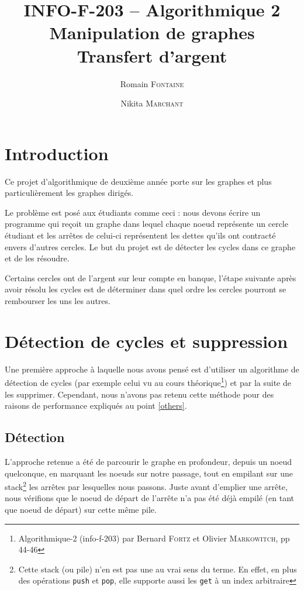 \documentclass[12pt, oneside]{article}
\title{{\normalsize{INFO-F-203 -- Algorithmique 2}}\\Manipulation de graphes\\ Transfert d’argent}
\author{Romain \textsc{Fontaine} \and Nikita \textsc{Marchant}}
\begin{document}
\maketitle

\section{Introduction}

Ce projet d'algorithmique de deuxième année porte sur les graphes et plus particulièrement les graphes dirigés.

Le problème est posé aux étudiants comme ceci : nous devons écrire un programme qui reçoit un graphe dans lequel chaque noeud représente un cercle étudiant et les arrêtes de celui-ci représentent les dettes qu'ils ont contracté envers d'autres cercles. Le but du projet est de détecter les cycles dans ce graphe et de les résoudre.

Certains cercles ont de l'argent sur leur compte en banque, l'étape suivante après avoir résolu les cycles  est de déterminer dans quel ordre les cercles pourront se rembourser les uns les autres.


\section{Détection de cycles et suppression}
Une première approche à laquelle nous avons pensé est d'utiliser un algorithme de détection de cycles (par exemple celui vu au cours théorique\footnote{Algorithmique-2 (info-f-203) par Bernard \textsc{Fortz} et Olivier \textsc{Markowitch}, pp 44-46}) et par la suite de les supprimer. Cependant, nous n'avons pas retenu cette méthode pour des raisons de performance expliqués au point \ref{others}.

\subsection{Détection}
\label{detect}
L'approche retenue a été de parcourir le graphe en profondeur, depuis un noeud quelconque, en marquant les noeuds sur notre passage, tout en empilant sur une stack\footnote{Cette stack (ou pile) n'en  est pas une au vrai sens du terme. En effet, en plus des opérations \texttt{push} et \texttt{pop}, elle supporte aussi les \texttt{get} à un index arbitraire} les arrêtes par lesquelles nous passons. Juste avant d'emplier une arrête, nous vérifions que le noeud de départ de l'arrête n'a pas été déjà empilé (en tant que noeud de départ) sur cette même pile.
\end{document}
